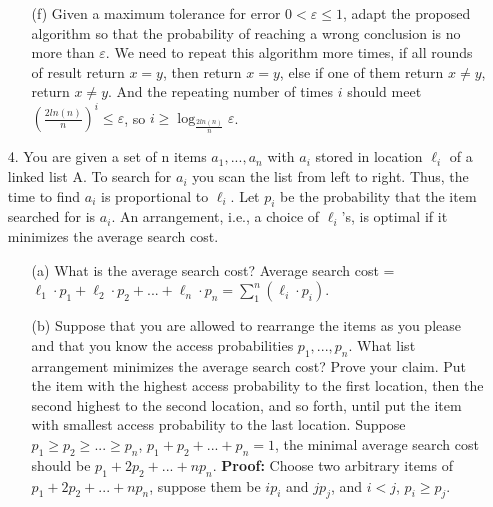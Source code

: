 \documentclass{article}       %
\begin{document}
\begin{enumerate}
\begin{enumerate}
		\item[(f)] Given a maximum tolerance for error $0 < \varepsilon \leq 1$, adapt the proposed algorithm so that the probability of reaching a wrong conclusion is no more than $\varepsilon$.\newline\newline
		We need to repeat this algorithm more times, if all rounds of result return $x =y$, then return $x=y$, else if one of them return $x \neq y$, return $x \neq y$.\newline
		And the repeating number of times $i$ should meet $(\frac{2ln(n)}{n})^i \leq \varepsilon$, so $i \geq \log_{\frac{2ln(n)}{n}} \varepsilon$.\newline
    \end{enumerate}
	\item[4.] You are given a set of n items $a_1, ..., a_n$ with $a_i$ stored in location ${\ell}_i$ of a linked list A. To search for $a_i$ you scan the list from left to right. Thus, the time to find $a_i$ is proportional to ${\ell}_i$. Let $p_i$ be the probability that the item searched for is $a_i$. An arrangement, i.e., a choice of ${\ell}_i$'s, is optimal if it minimizes the average search cost.
	\begin{enumerate}
		\item[(a)] What is the average search cost?\newline\newline
		Average search cost = ${\ell}_1 \cdot p_1+{\ell}_2 \cdot p_2+...+{\ell}_n \cdot p_n = \sum_{1}^n ({\ell}_i \cdot p_i)$.\newline
		\item[(b)] Suppose that you are allowed to rearrange the items as you please and that you know the access probabilities $p_1, ..., p_n$. What list arrangement minimizes the average search cost? Prove your claim.\newline\newline
		Put the item with the highest access probability to the first location, then the second highest to the second location, and so forth, until put the item with smallest access probability to the last location.\newline
		Suppose $p_1 \geq p_2 \geq ... \geq p_n$, $p_1 + p_2 + ... + p_n = 1$, the minimal average search cost should be $p_1+2p_2+ ... + np_n$.\newline
		\textbf{Proof:} Choose two arbitrary items of $p_1+2p_2+ ... + np_n$, suppose them be $ip_i$ and $jp_j$, and $i < j$, $p_i \geq p_j$.\newline

\end{enumerate}
\end{enumerate}
\end{document}
